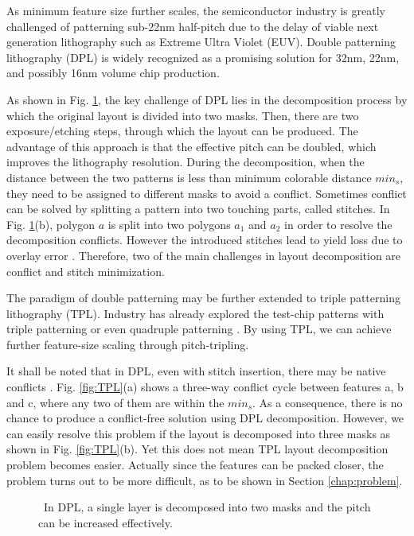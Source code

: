 \documentclass[10pt,conference]{IEEEtran}
\begin{document}
As minimum feature size further scales, the semiconductor industry is greatly challenged of patterning sub-22nm half-pitch due to the delay of viable next generation lithography such as Extreme Ultra Violet (EUV).
Double patterning lithography (DPL) is widely recognized as a promising solution for 32nm, 22nm, and possibly 16nm volume chip production.

As shown in Fig. \ref{fig:DPL}, the key challenge of DPL lies in the decomposition process by which the original layout is divided into two masks.
Then, there are two exposure/etching steps, through which the layout can be produced.
The advantage of this approach is that the effective pitch can be doubled, which improves the lithography resolution.
During the decomposition, when the distance between the two patterns is less than minimum colorable distance $min_s$, they need to be assigned to different masks to avoid a conflict.
Sometimes conflict can be solved by splitting a pattern into two touching parts, called stitches.
In Fig. \ref{fig:DPL}(b), polygon $a$ is split into two polygons $a_1$ and $a_2$ in order to resolve the decomposition conflicts.
However the introduced stitches lead to yield loss due to overlay error  \cite{DPL_ICCAD08_Yang}.
Therefore, two of the main challenges in layout decomposition are conflict and stitch minimization.

The paradigm of double patterning may be further extended to triple patterning lithography (TPL).
Industry has already explored the test-chip patterns with triple patterning or even quadruple patterning \cite{2009Intel}.
By using TPL, we can achieve further feature-size scaling through pitch-tripling.

It shall be noted that in DPL, even with stitch insertion, there may be native conflicts \cite{DPL_SPIE07_Anton}.
Fig. \ref{fig:TPL}(a) shows a three-way conflict cycle between features a, b and c, where any two of them are within the $min_s$.
As a consequence, there is no chance to produce a conflict-free solution using DPL decomposition.
However, we can easily resolve this problem if the layout is decomposed into three masks as shown in Fig. \ref{fig:TPL}(b). 
Yet this does not mean TPL layout decomposition problem becomes easier. Actually since the features can be packed closer, the problem turns out to be more difficult, as to be shown in Section  \ref{chap:problem}.


\begin{figure}[bt]
    \centering
    \caption{~In DPL, a single layer is decomposed into two masks and the pitch can be increased effectively.}
    \label{fig:DPL}
\end{figure}
\end{document}
